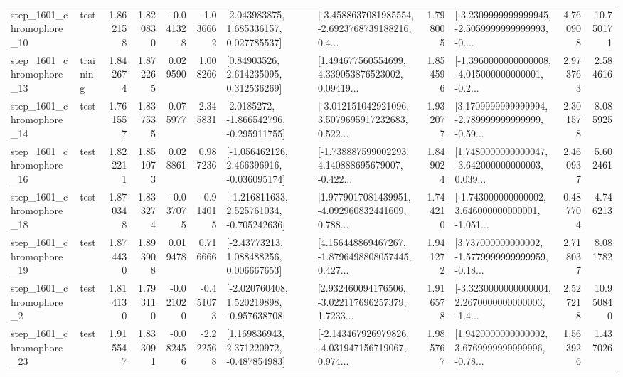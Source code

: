 \begin{tabular}{llrrrrllrlrr}
 step\_1601\_chromophore\_10 &      test &      1.862158 &    1.820830 &     -0.041328 & -1.036662 &     [2.043983875, 1.685336157, 0.027785537] &  [-3.4588637081985554, -2.6923768739188216, 0.4... &       1.798005 &  [-3.2309999999999945, -2.5059999999999993, -0.... &            4.760908 &         10.750171 \\
 step\_1601\_chromophore\_13 &  training &      1.842674 &    1.872265 &      0.029590 &  1.008266 &      [0.84903526, 2.614235095, 0.312536269] &  [1.494677560554699, 4.339053876523002, 0.09419... &       1.854596 &  [-1.3960000000000008, -4.015000000000001, -0.2... &            2.973763 &          2.584616 \\
 step\_1601\_chromophore\_14 &      test &      1.761557 &    1.837535 &      0.075977 &  2.345831 &     [2.0185272, -1.866542796, -0.295911755] &  [-3.012151042921096, 3.5079695917232683, 0.522... &       1.932077 &  [3.1709999999999994, -2.789999999999999, -0.59... &            2.301578 &          8.085925 \\
 step\_1601\_chromophore\_16 &      test &      1.822211 &    1.851073 &      0.028861 &  0.987236 &   [-1.056462126, 2.466396916, -0.036095174] &  [-1.738887599002293, 4.140888695679007, -0.422... &       1.849024 &  [1.7480000000000047, -3.642000000000003, 0.039... &            2.460937 &          5.602461 \\
 step\_1601\_chromophore\_18 &      test &      1.870348 &    1.833274 &     -0.037075 & -0.914015 &   [-1.216811633, 2.525761034, -0.705242636] &  [1.9779017081439951, -4.092960832441609, 0.788... &       1.744210 &  [-1.743000000000002, 3.646000000000001, -1.051... &            0.487704 &          4.746213 \\
 step\_1601\_chromophore\_19 &      test &      1.874430 &    1.893908 &      0.019478 &  0.716666 &     [-2.43773213, 1.088488256, 0.006667653] &  [4.156448869467267, -1.8796498808057445, 0.427... &       1.941272 &  [3.737000000000002, -1.5779999999999959, -0.18... &            2.718037 &          8.081782 \\
  step\_1601\_chromophore\_2 &      test &      1.814130 &    1.793110 &     -0.021020 & -0.451073 &   [-2.020760408, 1.520219898, -0.957638708] &  [2.932460094176506, -3.022117696257379, 1.7233... &       1.916578 &  [-3.3230000000000004, 2.2670000000000003, -1.4... &            2.527218 &         10.950840 \\
 step\_1601\_chromophore\_23 &      test &      1.915547 &    1.833091 &     -0.082456 & -2.222568 &    [1.169836943, 2.371220972, -0.487854983] &  [-2.143467926979826, -4.031947156719067, 0.974... &       1.985767 &  [1.9420000000000002, 3.6769999999999996, -0.78... &            1.563926 &          1.437026 \\

\end{tabular}
